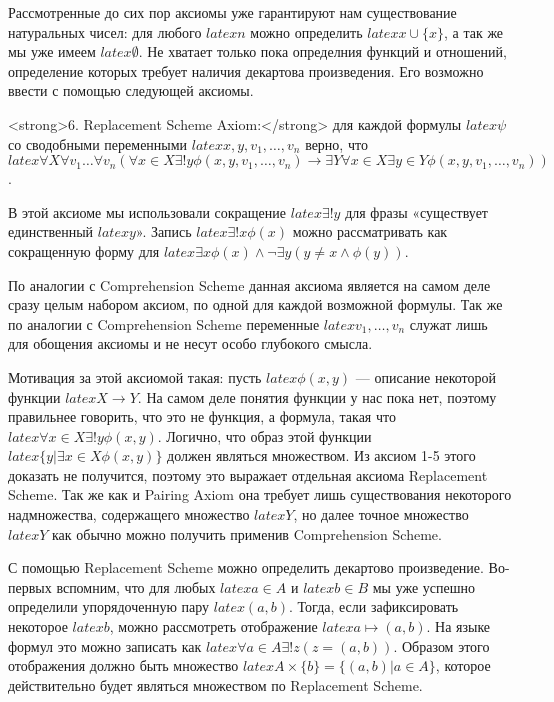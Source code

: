 Рассмотренные до сих пор аксиомы уже гарантируют нам существование натуральных чисел: для любого $latex n$ можно определить $latex x\cup\{x\}$, а так же мы уже имеем $latex \emptyset$. Не хватает только пока определния функций и отношений, определение которых требует наличия декартова произведения. Его возможно ввести с помощью следующей аксиомы.

<strong>6. Replacement Scheme Axiom:</strong> для каждой формулы $latex \psi$ со сводобными переменными $latex x, y, v_1, \ldots, v_n$ верно, что $latex \forall X \forall v_1 \ldots \forall v_n (\forall x\in X \exists ! y \phi(x, y, v_1, \ldots, v_n) \rightarrow \exists Y \forall x \in X \exists y \in Y \phi(x, y, v_1, \ldots, v_n))$.

В этой аксиоме мы использовали сокращение $latex \exists!y$ для фразы «существует единственный $latex y$». Запись $latex \exists!x\phi(x)$ можно рассматривать как сокращенную форму для $latex \exists x \phi(x) \wedge \neg \exists y (y\not=x \wedge \phi(y))$.

По аналогии с Comprehension Scheme данная аксиома является на самом деле сразу целым набором аксиом, по одной для каждой возможной формулы. Так же по аналогии с Comprehension Scheme переменные $latex v_1, \ldots, v_n$ служат лишь для обощения аксиомы и не несут особо глубокого смысла.

Мотивация за этой аксиомой такая: пусть $latex \phi(x, y)$ — описание некоторой функции $latex X\to Y$. На самом деле понятия функции у нас пока нет, поэтому правильнее говорить, что это не функция, а формула, такая что $latex \forall x\in X \exists!y \phi(x, y)$. Логично, что образ этой функции $latex \{y|\exists x \in X \phi(x, y)\}$ должен являться множеством. Из аксиом 1-5 этого доказать не получится, поэтому это выражает отдельная аксиома Replacement Scheme. Так же как и Pairing Axiom она требует лишь существования некоторого надмножества, содержащего множество $latex Y$, но далее точное множество $latex Y$ как обычно можно получить применив Comprehension Scheme.

С помощью Replacement Scheme можно определить декартово произведение. Во-первых вспомним, что для любых $latex a\in A$ и $latex b\in B$ мы уже успешно определили упорядоченную пару $latex (a, b)$. Тогда, если зафиксировать некоторое $latex b$, можно рассмотреть отображение $latex a \mapsto (a, b)$. На языке формул это можно записать как $latex \forall a\in A \exists!z (z = (a, b))$. Образом этого отображения должно быть множество $latex A\times\{b\} = \{(a, b)| a\in A\}$, которое действительно будет являться множеством по Replacement Scheme.


